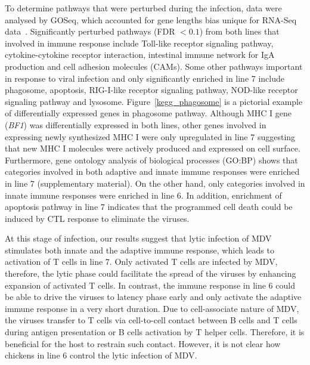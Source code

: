 \documentclass[10pt]{article}
\begin{document}
To determine pathways that were perturbed during the infection, data were
analysed by GOSeq, which accounted for gene lengths bias unique for RNA-Seq data~\cite{young2010method}.
Significantly perturbed pathways (FDR $< 0.1$) from both lines that involved in
immune response include Toll-like receptor signaling pathway, cytokine-cytokine receptor interaction,
intestinal immune network for IgA production and cell adhesion molecules (CAMs).
Some other pathways important in response to viral infection and only significantly
enriched in line 7 include phagosome, apoptosis, RIG-I-like receptor signaling pathway,
NOD-like receptor signaling pathway and lysosome.
Figure~\ref{kegg_phagosome} is a pictorial example of differentially expressed genes in phagosome pathway.
Although MHC I gene (\textit{BF1}) was differentially expressed in both lines, other genes involved in
expressing newly synthesized MHC I were only upregulated in line 7
suggesting that new MHC I molecules were actively produced and expressed on cell surface.
Furthermore, gene ontology analysis of biological processes (GO:BP) shows that categories involved in
both adaptive and innate immune responses were enriched in line 7 (supplementary material).
On the other hand, only categories involved in innate immune responses were enriched in line 6.
In addition, enrichment of apoptosis pathway in line 7 indicates that the programmed
cell death could be induced by CTL response to eliminate the viruses.

At this stage of infection, our results suggest that lytic infection of MDV stimulates
both innate and the adaptive immune response, which leads to activation of T cells in line 7.
Only activated T cells are infected by MDV, therefore, the lytic phase could facilitate the spread of
the viruses by enhancing expansion of activated T cells.
In contrast, the immune response in line 6 could be able to drive the viruses to latency phase early
and only activate the adaptive immune response in a very short duration.
Due to cell-associate nature of MDV, the viruses transfer to T cells via cell-to-cell contact between B cells and
T cells during antigen presentation or B cells activation by T helper cells.
Therefore, it is beneficial for the host to restrain such contact.
However, it is not clear how chickens in line 6 control the lytic infection of MDV.
\end{document}
